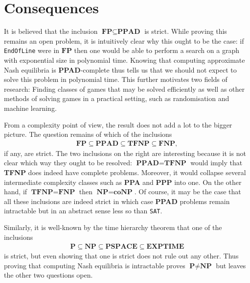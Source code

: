 \documentclass{article}
\begin{document}
\section{Consequences}

It is believed that the inclusion $\textbf{FP}\subseteq\textbf{PPAD}$ is strict.
While proving this remains an open problem, it is intuitively clear why this
ought to be the case: if \texttt{EndOfLine} were in $\textbf{FP}$ then one
would be able to perform a search on a graph with exponential size in
polynomial time. Knowing that computing approximate Nash equilibria is
\textbf{PPAD}-complete thus tells us that we should not expect to solve
this problem in polynomial time. This further motivates two fields of
research: Finding classes of games that may be solved efficiently as
well as other methods of solving games in a practical setting, such as
randomisation and machine learning.

From a complexity point of view, the result does not add a lot to the
bigger picture. The question remains of which of the inclusions
\begin{align*}
  \textbf{FP} \subseteq \textbf{PPAD} \subseteq \textbf{TFNP} \subseteq
  \textbf{FNP},
\end{align*}
if any, are strict. The two inclusions on the right are interesting
because it is not clear which way they ought to be resolved:
$\textbf{PPAD}=\textbf{TFNP}$ would imply that \textbf{TFNP} does
indeed have complete problems. Moreover, it would collapse
several intermediate complexity classes such as \textbf{PPA}
and \textbf{PPP} into one. On the other hand, if
$\textbf{TFNP}=\textbf{FNP}$ then $\textbf{NP}=\textbf{coNP}$.
\cite{goldberg2018} Of course, it may be the case that all these
inclusions are indeed strict in which case \textbf{PPAD} problems
remain intractable but in an abstract sense less so than \texttt{SAT}.

Similarly, it is well-known by the time hierarchy theorem that
one of the inclusions
\begin{align*}
  \textbf{P}\subseteq\textbf{NP}\subseteq\textbf{PSPACE}\subseteq\textbf{EXPTIME}
\end{align*}
is strict, but even showing that one is strict does not rule out
any other. Thus proving that computing Nash equilibria
is intractable proves $\textbf{P}\neq\textbf{NP}$ but leaves the
other two questions open.


\printbibliography
\end{document}

